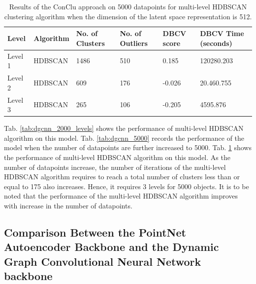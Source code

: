 \begin{table}[H]
  \setlength\extrarowheight{10pt}
  \caption{Results of the ConClu approach on 5000 datapoints for multi-level \ac{HDBSCAN} clustering algorithm when the dimension of the latent space representation is 512. }
  \centering
  \begin{tabular}{|l|l|l|l|l|l|}
    \toprule
    Level & Algorithm	& No. of Clusters	& No. of Outliers	& DBCV score	& \ac{DBCV} Time (seconds)	\\  
    \midrule
    Level 1 & \ac{HDBSCAN} & 1486	& 510	& 0.185	& 120280.203 \\ \cline{1-6}
    Level 2 & \ac{HDBSCAN} & 609	& 176	& -0.026	& 20.460.755 \\ \cline{1-6}
    Level 3 & \ac{HDBSCAN} & 265	& 106	& -0.205	& 4595.876 \\
    \bottomrule
  \end{tabular}
  \label{tab:dgcnn_5000_levels}
\end{table} 

Tab. \ref{tab:dgcnn_2000_levels} shows the performance of multi-level \ac{HDBSCAN} algorithm on this model. Tab. \ref{tab:dgcnn_5000} records the performance of the model when the number of datapoints are further increased to 5000. Tab. \ref{tab:dgcnn_5000_levels} shows the performance of multi-level \ac{HDBSCAN} algorithm on this model. As the number of datapoints increase, the number of iterations of the multi-level \ac{HDBSCAN} algorithm requires to reach a total number of clusters less than or equal to 175 also increases. Hence, it requires 3 levels for 5000 objects. It is to be noted that the performance of the multi-level \ac{HDBSCAN} algorithm improves with increase in the number of datapoints. 

\subsection{Comparison Between the PointNet Autoencoder Backbone and the Dynamic Graph Convolutional Neural Network backbone}

